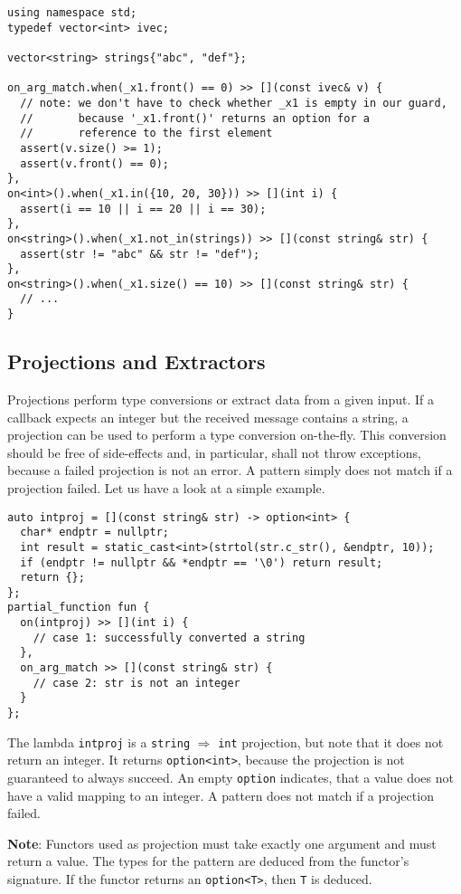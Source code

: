\begin{lstlisting}
using namespace std;
typedef vector<int> ivec;

vector<string> strings{"abc", "def"};

on_arg_match.when(_x1.front() == 0) >> [](const ivec& v) {
  // note: we don't have to check whether _x1 is empty in our guard,
  //       because '_x1.front()' returns an option for a 
  //       reference to the first element
  assert(v.size() >= 1);
  assert(v.front() == 0);
},
on<int>().when(_x1.in({10, 20, 30})) >> [](int i) {
  assert(i == 10 || i == 20 || i == 30);
},
on<string>().when(_x1.not_in(strings)) >> [](const string& str) {
  assert(str != "abc" && str != "def");
},
on<string>().when(_x1.size() == 10) >> [](const string& str) {
  // ...
}
\end{lstlisting}

\subsection{Projections and Extractors}

Projections perform type conversions or extract data from a given input.
If a callback expects an integer but the received message contains a string, a projection can be used to perform a type conversion on-the-fly.
This conversion should be free of side-effects and, in particular, shall not throw exceptions, because a failed projection is not an error.
A pattern simply does not match if a projection failed.
Let us have a look at a simple example.

\begin{lstlisting}
auto intproj = [](const string& str) -> option<int> {
  char* endptr = nullptr;
  int result = static_cast<int>(strtol(str.c_str(), &endptr, 10));
  if (endptr != nullptr && *endptr == '\0') return result;
  return {};
};
partial_function fun {
  on(intproj) >> [](int i) {
    // case 1: successfully converted a string
  },
  on_arg_match >> [](const string& str) {
    // case 2: str is not an integer
  }
};
\end{lstlisting}

The lambda \lstinline^intproj^ is a \lstinline^string^ $\Rightarrow$ \lstinline^int^ projection, but note that it does not return an integer.
It returns \lstinline^option<int>^, because the projection is not guaranteed to always succeed.
An empty \lstinline^option^ indicates, that a value does not have a valid mapping to an integer.
A pattern does not match if a projection failed.

\textbf{Note}: Functors used as projection must take exactly one argument and must return a value.
The types for the pattern are deduced from the functor's signature.
If the functor returns an \lstinline^option<T>^, then \lstinline^T^ is deduced.











